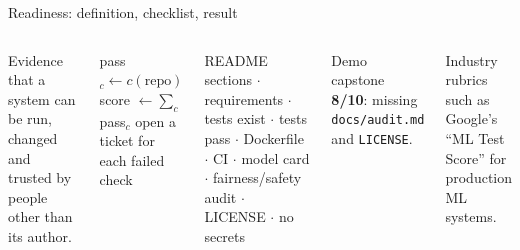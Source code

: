 \documentclass[aspectratio=169,11pt]{beamer}
\begin{document}
\begin{frame}{Readiness: definition, checklist, result}
\begin{columns}[T]
\begin{bdef}
Evidence that a system can be run, changed and trusted by people other than its author.
\end{bdef}
\begin{balgo}
\begin{algorithmic}[1]
  \State pass$_c\gets c(\text{repo})$
\EndFor
\State score $\gets\sum_c$ pass$_c$
\State open a ticket for each failed check
\end{algorithmic}
\end{balgo}
\begin{bex}
README sections $\cdot$ requirements $\cdot$ tests exist $\cdot$ tests pass $\cdot$ Dockerfile $\cdot$ CI $\cdot$ model card $\cdot$ fairness/safety audit $\cdot$ LICENSE $\cdot$ no secrets
\end{bex}
\begin{bres}
Demo capstone \textbf{8/10}: missing \texttt{docs/audit.md} and \texttt{LICENSE}.
\end{bres}
\begin{bapp}
Industry rubrics such as Google's ``ML Test Score'' for production ML systems.
\end{bapp}
\end{columns}
\end{frame}

\end{document}
